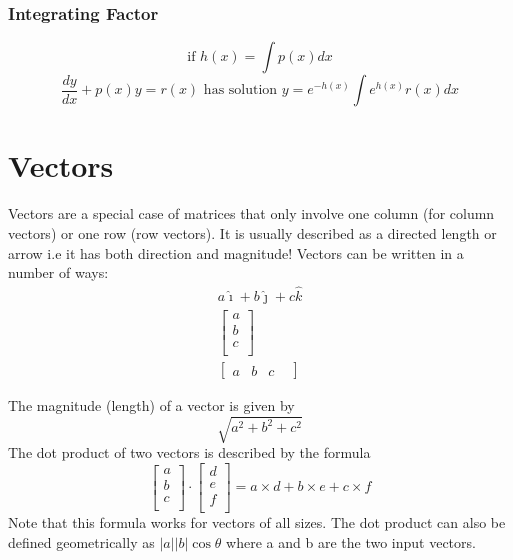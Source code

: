 \documentclass[12pt] {article}
\begin{document}
\subsubsection*{Integrating Factor}
\begin{equation*}
\text{if } h(x)=\int p(x)dx
\end{equation*}
\begin{equation*}
  \frac{dy}{dx} + p(x)y = r(x) \text{ has solution } y = e^{-h(x)} \int e^{h(x)}r(x)dx
\end{equation*}


\section{Vectors}
Vectors are a special case of matrices that only involve one column (for column vectors)
or one row (row vectors). It is usually described as a directed length or arrow i.e 
it has both direction and magnitude! Vectors can be written in a number of ways:
\begin{gather*}
  a\hat{\imath} + b\hat{\jmath} + c\hat{k} \\
  \begin{bmatrix} 
    a \\
    b \\ 
    c \\
  \end{bmatrix} \\
  \begin{bmatrix}
    a &
    b & 
    c &
  \end{bmatrix} 
\end{gather*}

The magnitude (length) of a vector is given by 
\begin{equation*}
  \sqrt{a^2+b^2+c^2}
\end{equation*}
The dot product of two vectors is described by the formula
\begin{equation*}
  \begin{bmatrix}
    a \\
    b \\ 
    c \\
  \end{bmatrix} \cdot
  \begin{bmatrix}
    d \\
    e \\ 
    f \\
  \end{bmatrix}
  = a\times d + b\times e + c \times f 
\end{equation*}
Note that this formula works for vectors of all sizes. The dot product can also be defined 
geometrically as $|a||b|\cos\theta$ where a and b are the two input vectors.
\end{document}
